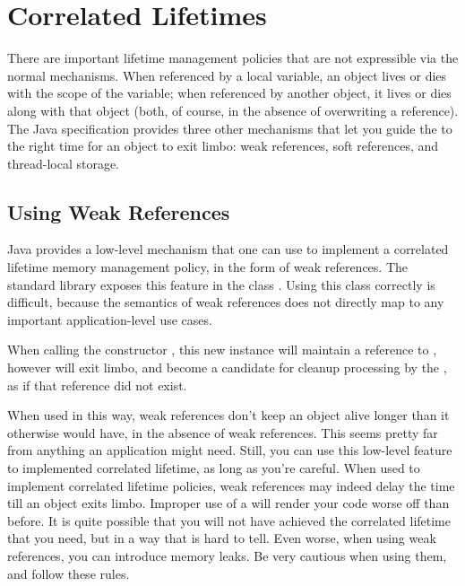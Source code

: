\chapter{Correlated Lifetimes}



There are important lifetime management policies that are not expressible via the
normal mechanisms. When referenced by a local variable, an object lives or dies
with the scope of the variable; when referenced by another object, it lives or
dies along with that object (both, of course, in the absence of overwriting a
reference). The Java specification provides three other mechanisms that let you
guide the \jre to the right time for an object to exit limbo: weak references,
soft references, and thread-local storage.

\section{Using Weak References}

Java provides a low-level mechanism that one can use to implement a
correlated lifetime memory management policy, in the form of weak references.
The standard library exposes this feature in the class
. Using this class correctly is
difficult, because the semantics of weak references does not directly map to
any important application-level use cases.

\begin{definition}
When calling the constructor ,
 this new instance will maintain a reference to , however
  will exit limbo, and become a candidate for cleanup processing by 
the \jre, as if that reference did not exist.
\end{definition} 

When used in this way, weak references don't keep an object alive longer than it
otherwise would have, in the absence of weak references. 
This seems pretty far from anything an application might
need. Still, you can use this low-level feature to implemented correlated
lifetime, as long as you're careful. 
When used to implement correlated lifetime policies, weak references may
indeed delay the time till an object exits limbo.
Improper use of a  will
render your code worse off than before. It is quite possible that you will not
have achieved the correlated lifetime that you need, but in a way that is hard
to tell. Even worse, when using weak references, you can introduce memory
leaks. Be very cautious when using them, and follow these rules.

